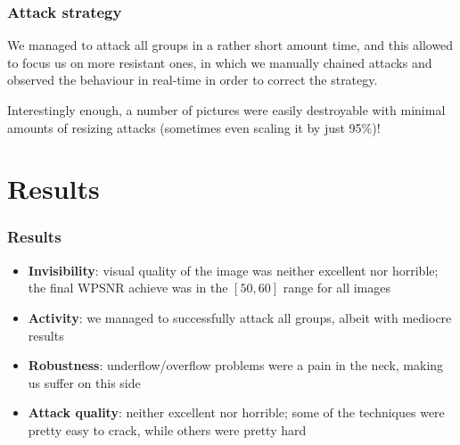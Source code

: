 \begin{frame}
    \frametitle{Attack strategy}

    We managed to attack all groups in a rather short amount time, and this allowed to focus us on more resistant ones, in which we manually chained attacks and observed the behaviour in real-time in order to correct the strategy.

    \medskip

     {
        Interestingly enough, a number of pictures were easily destroyable with minimal amounts of resizing attacks (sometimes even scaling it by just 95\%)!
    }

    \medskip

\end{frame}

\section{Results}
\begin{frame}
    \frametitle{Results}
    \begin{itemize}
        \item \textbf{Invisibility}: visual quality of the image was neither excellent nor horrible; the final WPSNR achieve was in the $[50,60]$ range for all images
        \item<2-> \textbf{Activity}: we managed to successfully attack all groups, albeit with mediocre results
        \item<3-> \textbf{Robustness}: underflow/overflow problems were a pain in the neck, making us suffer on this side
        \item<4-> \textbf{Attack quality}: neither excellent nor horrible; some of the techniques were pretty easy to crack, while others were pretty hard
    \end{itemize}
\end{frame}